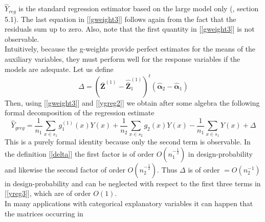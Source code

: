 \documentclass[a4paper,12pt,leqno, titlepage]{article}
\begin{document}
$\hat{Y}_{reg}$ is the standard regression estimator based on the large model only (\cite{mandallaz}, section 5.1). The last equation in [\ref{gweight3}] follows again from the fact that the residuals sum up to zero. Also, note that the first quantity in [\ref{gweight3}] is not observable. \\
Intuitively, because the g-weights provide perfect estimates for the means of the auxiliary variables, they must perform well for the response variables if the models are adequate. Let us define
\begin{equation}\label{delta}
\Delta=(\bar{\pmb{Z}}^{(1)}-\hat{\bar{\pmb{Z}}}^{(1)}_1)^t
(\hat{\pmb{\alpha}}_2-\hat{\pmb{\alpha}}_1)
\end{equation}
Then, using [\ref{gweight3}] and [\ref{ygreg2}] we obtain after some algebra the following formal decomposition of the regression estimate
\begin{equation}\label{yreg3}
\hat{Y}_{greg}=\frac{1}{n_1}\sum_{x\in{s}_1}g_1^{(1)}(x)Y(x)+
\frac{1}{n_2}\sum_{x\in{s}_2}g_2(x)Y(x)-\frac{1}{n_1}\sum_{x\in{s}_1}Y(x) +\Delta
\end{equation}
This is a purely formal identity because only the second term is observable. In the definition
[\ref{delta}] the first factor is of order $O(n_1^{-\frac{1}{2}})$ in design-probability and likewise the second factor of order $O(n_2^{-\frac{1}{2}})$. Thus $\Delta$ is of order $=O(n_2^{-1})$ in design-probability and can be neglected with respect to the first three terms in [\ref{yreg3}], which are of order $O(1)$.\\
In many applications with categorical explanatory variables it can happen that the matrices occurring in
\end{document}
